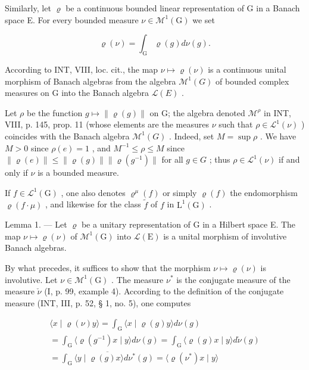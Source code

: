 Similarly, let \(\varrho\) be a continuous bounded linear representation of G in a Banach space E. For every bounded measure \(\nu \in \mathcal{M}^{1}(\mathrm{G})\) we set

\[
\varrho (\nu) = \int_ {\mathrm{G}} \varrho (g) d \nu (g).
\]

According to INT, VIII, loc. cit., the map \(\nu \mapsto \varrho(\nu)\) is a continuous unital morphism of Banach algebras from the algebra \(\mathcal{M}^{1}(G)\) of bounded complex measures on G into the Banach algebra \(\mathcal{L}(E)\) .

Let \(\rho\) be the function \(g\mapsto\|\varrho(g)\|\) on G; the algebra denoted \(\mathcal{M}^{\rho}\) in INT, VIII, p. 145, prop. 11 (whose elements are the measures \(\nu\) such that \(\rho\in\mathcal{L}^{1}(\nu)\) ) coincides with the Banach algebra \(\mathcal{M}^{1}(G)\) . Indeed, set \(M = \sup \rho\) . We have \(M > 0\) since \(\rho(e)=1\) , and \(M^{-1} \leqslant \rho \leqslant M\) since \(\|\varrho(e)\|\leqslant\|\varrho(g)\|\|\varrho(g^{-1})\|\) for all \(g\in G\) ; thus \(\rho\in\mathcal{L}^{1}(\nu)\) if and only if \(\nu\) is a bounded measure.

If \(f \in \mathcal{L}^{1}(\mathrm{G})\) , one also denotes \(\varrho^{\mu}(f)\) or simply \(\varrho(f)\) the endomorphism \(\varrho(f \cdot \mu)\) , and likewise for the class \(\tilde{f}\) of \(f\) in \(\mathrm{L}^{1}(\mathrm{G})\) .

Lemma 1. --- Let \(\varrho\) be a unitary representation of G in a Hilbert space E. The map \(\nu \mapsto \varrho(\nu)\) of \(\mathcal{M}^{1}(\mathrm{G})\) into \(\mathcal{L}(\mathrm{E})\) is a unital morphism of involutive Banach algebras.

By what precedes, it suffices to show that the morphism \(\nu \mapsto \varrho(\nu)\) is involutive. Let \(\nu \in \mathcal{M}^{1}(\mathrm{G})\) . The measure \(\nu^{*}\) is the conjugate measure of the measure \(\check{\nu}\) (I, p. 99, example 4). According to the definition of the conjugate measure (INT, III, p. 52, § 1, no. 5), one computes

\[
\begin{array}{c} \langle x \mid \varrho (\nu) y \rangle = \int_ {\mathrm{G}} \langle x \mid \varrho (g) y \rangle d \nu (g) \\ = \int_ {\mathrm{G}} \langle \varrho (g ^ {- 1}) x \mid y \rangle d \nu (g) = \int_ {\mathrm{G}} \langle \varrho (g) x \mid y \rangle d \check {\nu} (g) \\ = \overline {{\int_ {\mathrm{G}} \langle y \mid \varrho (g) x \rangle d \nu^ {*} (g)}} = \langle \varrho (\nu^ {*}) x \mid y \rangle \end{array}
\]

